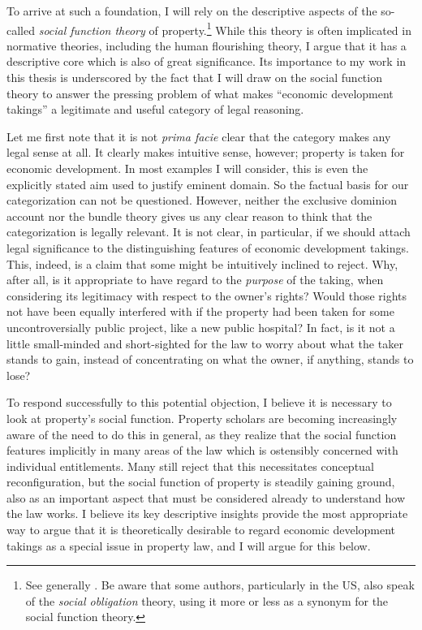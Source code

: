 To arrive at such a foundation, I will rely on the descriptive aspects of the so-called {\it social function theory} of property.\footnote{See generally \cite{foster11,mirow10,alexander09a}. Be aware that some authors, particularly in the US, also speak of the {\it social obligation} theory, using it more or less as a synonym for the social function theory.} While this theory is often implicated in normative theories, including the human flourishing theory, I argue that it has a descriptive core which is also of great significance. Its importance to my work in this thesis is underscored by the fact that I will draw on the social function theory to answer the pressing problem of what makes ``economic development takings'' a legitimate and useful category of legal reasoning. 

Let me first note that it is not {\it prima facie} clear that the category makes any legal sense at all. It clearly makes intuitive sense, however; property is taken for economic development. In most examples I will consider, this is even the explicitly stated aim used to justify eminent domain. So the factual basis for our categorization can not be questioned. However, neither the exclusive dominion account nor the bundle theory gives us any clear reason to think that the categorization is legally relevant. It is not clear, in particular, if we should attach legal significance to the distinguishing features of economic development takings. This, indeed, is a claim that some might be intuitively inclined to reject. Why, after all, is it appropriate to have regard to the {\it purpose} of the taking, when considering its legitimacy with respect to the owner's rights? Would those rights not have been equally interfered with if the property had been taken for some uncontroversially public project, like a new public hospital? In fact, is it not a little small-minded and short-sighted for the law to worry about what the taker stands to gain, instead of concentrating on what the owner, if anything, stands to lose?

To respond successfully to this potential objection, I believe it is necessary to look at property's social function. Property scholars are becoming increasingly aware of the need to do this in general, as they realize that the social function features implicitly in many areas of the law which is ostensibly concerned with individual entitlements. Many still reject that this necessitates conceptual reconfiguration, but the social function of property is steadily gaining ground, also as an important aspect that must be considered already to understand how the law works. I believe its key descriptive insights provide the most appropriate way to argue that it is theoretically desirable to regard economic development takings as a special issue in property law, and I will argue for this below. 

